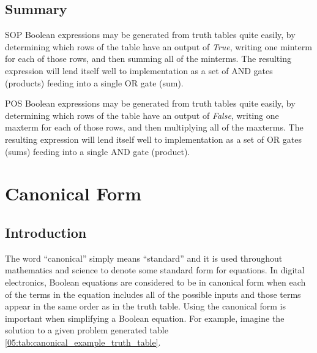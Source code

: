 \subsection{Summary}
\label{05:subsubsec:summary_minterms_and_maxterms}

\ac{SOP} Boolean expressions may be generated from truth tables quite easily, by determining which rows of the table have an output of \emph{True}, writing one minterm for each of those rows, and then summing all of the minterms. The resulting expression will lend itself well to implementation as a set of \textsf{AND} gates (products) feeding into a single \textsf{OR} gate (sum). 

\ac{POS} Boolean expressions may be generated from truth tables quite easily, by determining which rows of the table have an output of \emph{False}, writing one maxterm for each of those rows, and then multiplying all of the maxterms. The resulting expression will lend itself well to implementation as a set of \textsf{OR} gates (sums) feeding into a single \textsf{AND} gate (product). 

\section{Canonical Form}
\label{05:sec:canonical_form}

\subsection{Introduction}
\label{05:subsec:introduction_to_canonical_form}

The word ``canonical'' simply means ``standard'' and it is used throughout mathematics and science to denote some standard form for equations. In digital electronics, Boolean equations are considered to be in canonical form when each of the terms in the equation includes all of the possible inputs and those terms appear in the same order as in the truth table. Using the canonical form is important when simplifying a Boolean equation. For example, imagine the solution to a given problem generated table \ref{05:tab:canonical_example_truth_table}.

